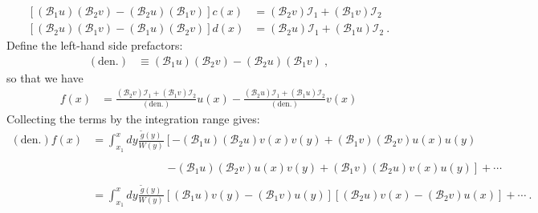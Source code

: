 \begin{align}
	\left[ \left(\mathcal B_1 u\right)\left(\mathcal B_2 v\right) - \left(\mathcal B_2 u\right)\left(\mathcal B_1 v\right)  \right]
	c(x)
	&= 
	\left(\mathcal B_2 v\right)
	\mathcal{I}_1 
	+
	\left(\mathcal B_1 v\right)
	\mathcal{I}_2 
	\\
	\left[ 
		\left(\mathcal B_2 u\right)\left(\mathcal B_1 v\right) 
		- 
		\left(\mathcal B_1 u\right)\left(\mathcal B_2 v\right)  
	\right]
	d(x)
	&= 
	\left(\mathcal B_2 u\right)
	\mathcal{I}_1 
	+ 
	\left(\mathcal B_1 u\right)
	\mathcal{I}_2 
	\ .
\end{align}
Define the left-hand side prefactors:
\begin{align}
	(\text{den}.) &\equiv
	\left(\mathcal B_1 u\right)\left(\mathcal B_2 v\right) - \left(\mathcal B_2 u\right)\left(\mathcal B_1 v\right)  \ ,
\end{align}
so that we have 
\begin{align}
	f(x) &= 
	\frac{\left(\mathcal B_2 v\right)
		\mathcal{I}_1 
		+
		\left(\mathcal B_1 v\right)
		\mathcal{I}_2}{(\text{den.})}
	u(x)
	-
	\frac{\left(\mathcal B_2 u\right)
		\mathcal{I}_1 
		+
		\left(\mathcal B_1 u\right)
		\mathcal{I}_2}{(\text{den.})}
	v(x)
\end{align}
Collecting the terms by the integration range gives:
\begin{align}
	(\text{den.})f(x)&=
	\int_{x_1}^x dy \frac{\tilde g(y)}{W(y)}
	\left[
		-(\mathcal B_1u)(\mathcal B_2u) v(x)v(y)
		+(\mathcal B_1v)(\mathcal B_2v) u(x)u(y)
		\right.
	\\
	&\phantom{=\int_{x_1}^x dy \frac{\tilde g(y)}{W(y)}[}
		\left.
		-(\mathcal B_1u)(\mathcal B_2v) u(x)v(y)
		+(\mathcal B_1v)(\mathcal B_2u) v(x)u(y)
	\right] + \cdots
	\\
	&=
	\int_{x_1}^x dy \frac{\tilde g(y)}{W(y)}
	\left[
		(\mathcal B_1u)v(y) - (\mathcal B_1v)u(y)
	\right] 
	\left[
		(\mathcal B_2u)v(x) - (\mathcal B_2v)u(x)
	\right] + \cdots \ .
\end{align}
